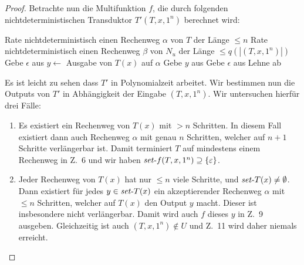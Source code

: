 \begin{proof}
    Betrachte nun die Multifunktion $f$, die durch folgenden nichtdeterministischen Transduktor $T'(T, x, 1^n)$ berechnet wird:\par
    \begin{algorithm}[H]
        Rate nichtdeterministisch einen Rechenweg $\alpha$ von $T$ der Länge $\leq n$\;
        Rate nichtdeterministisch einen Rechenweg $\beta$ von $N_u$ der Länge $\leq q(|(T, x, 1^n)|)$\;
        {
            Gebe $\epsilon$ aus\;
        }
        {
            $y\gets $ Ausgabe von $T(x)$ auf $\alpha$\;
            Gebe $y$ aus\;
        }
        {
            Gebe $\epsilon$ aus\;
        }
        \Else
        {
            Lehne ab\;
        }
    \end{algorithm}
    Es ist leicht zu sehen dass $T'$ in Polynomialzeit arbeitet. 
    Wir bestimmen nun die Outputs von $T'$  in Abhängigkeit der Eingabe $(T, x, 1^n)$.
    Wir untersuchen hierfür drei Fälle:
    \begin{enumerate}[label=\arabic*.]
        \item Es existiert ein Rechenweg von $T(x)$ mit $>n$ Schritten. In diesem Fall existiert dann auch Rechenweg $\alpha$ mit genau $n$ Schritten, welcher auf $n+1$ Schritte verlängerbar ist. Damit terminiert $T$ auf mindestens einem Rechenweg in Z.~6 und wir haben $\mathit{set}\text{-}{f}(T, x, 1^n)\supseteq\{\varepsilon\}$.
        \item Jeder Rechenweg von $T(x)$ hat nur $\leq n$ viele Schritte, und $\mathit{set}\text{-}{T}(x)\neq\emptyset$. Dann existiert für jedes $y\in \mathit{set}\text{-}{T}(x)$ ein akzeptierender Rechenweg $\alpha$ mit $\leq n$ Schritten, welcher auf $T(x)$ den Output $y$ macht. Dieser ist insbesondere nicht verlängerbar. Damit wird auch $f$ dieses $y$ in Z.~9 ausgeben.
            Gleichzeitig ist auch $(T, x, 1^n)\not\in U$ und Z.~11 wird daher niemals erreicht.

\end{enumerate}
\end{proof}

